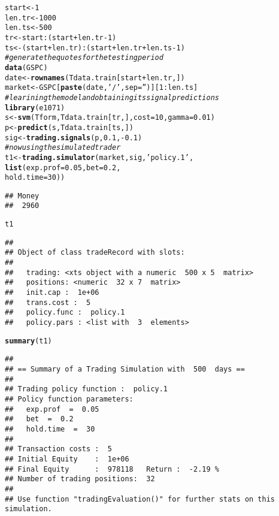 \documentclass{article}\usepackage[]{graphicx}\usepackage[]{color}
\makeatletter
\newcommand{\hlnum}[1]{\textcolor[rgb]{0.686,0.059,0.569}{#1}}%
\newcommand{\hlstr}[1]{\textcolor[rgb]{0.192,0.494,0.8}{#1}}%
\newcommand{\hlcom}[1]{\textcolor[rgb]{0.678,0.584,0.686}{\textit{#1}}}%
\newcommand{\hlopt}[1]{\textcolor[rgb]{0,0,0}{#1}}%
\newcommand{\hlstd}[1]{\textcolor[rgb]{0.345,0.345,0.345}{#1}}%
\newcommand{\hlkwb}[1]{\textcolor[rgb]{0.69,0.353,0.396}{#1}}%
\newcommand{\hlkwc}[1]{\textcolor[rgb]{0.333,0.667,0.333}{#1}}%
\newcommand{\hlkwd}[1]{\textcolor[rgb]{0.737,0.353,0.396}{\textbf{#1}}}%
\newenvironment{kframe}{%
 \def\at@end@of@kframe{}%
 \ifinner\ifhmode%
  \def\at@end@of@kframe{\end{minipage}}%
  \begin{minipage}{\columnwidth}%
 \fi\fi%
 \def\FrameCommand##1{\hskip\@totalleftmargin \hskip-\fboxsep
 \colorbox{shadecolor}{##1}\hskip-\fboxsep
     \hskip-\linewidth \hskip-\@totalleftmargin \hskip\columnwidth}%
 \MakeFramed {\advance\hsize-\width
   \@totalleftmargin\z@ \linewidth\hsize
   \@setminipage}}%
 {\par\unskip\endMakeFramed%
 \at@end@of@kframe}
\newenvironment{knitrout}{}{} %
\makeatother
\begin{document}
\begin{knitrout}
\color{fgcolor}\begin{kframe}
\begin{alltt}
\hlstd{start} \hlkwb{<-} \hlnum{1}
\hlstd{len.tr} \hlkwb{<-} \hlnum{1000}
\hlstd{len.ts} \hlkwb{<-} \hlnum{500}
\hlstd{tr} \hlkwb{<-} \hlstd{start}\hlopt{:}\hlstd{(start}\hlopt{+}\hlstd{len.tr}\hlopt{-}\hlnum{1}\hlstd{)}
\hlstd{ts} \hlkwb{<-} \hlstd{(start} \hlopt{+} \hlstd{len.tr)}\hlopt{:}\hlstd{(start}\hlopt{+}\hlstd{len.tr}\hlopt{+}\hlstd{len.ts}\hlopt{-}\hlnum{1}\hlstd{)}
\hlcom{#generate the quotes for the testing period}
\hlkwd{data}\hlstd{(GSPC)}
\hlstd{date} \hlkwb{<-} \hlkwd{rownames}\hlstd{(Tdata.train[start}\hlopt{+}\hlstd{len.tr, ])}
\hlstd{market} \hlkwb{<-} \hlstd{GSPC[}\hlkwd{paste}\hlstd{(date,} \hlstr{'/'}\hlstd{,} \hlkwc{sep} \hlstd{=} \hlstr{''}\hlstd{)][}\hlnum{1}\hlopt{:}\hlstd{len.ts]}
\hlcom{#learining the model and obtaining its signal predictions}
\hlkwd{library}\hlstd{(e1071)}
\hlstd{s} \hlkwb{<-} \hlkwd{svm}\hlstd{(Tform, Tdata.train[tr, ],} \hlkwc{cost} \hlstd{=} \hlnum{10}\hlstd{,} \hlkwc{gamma} \hlstd{=} \hlnum{0.01}\hlstd{)}
\hlstd{p} \hlkwb{<-} \hlkwd{predict}\hlstd{(s, Tdata.train[ts, ])}
\hlstd{sig} \hlkwb{<-} \hlkwd{trading.signals}\hlstd{(p,} \hlnum{0.1}\hlstd{,} \hlopt{-}\hlnum{0.1}\hlstd{)}
\hlcom{#now using the simulated trader}
\hlstd{t1} \hlkwb{<-} \hlkwd{trading.simulator}\hlstd{(market, sig,} \hlstr{'policy.1'}\hlstd{,}
                      \hlkwd{list}\hlstd{(}\hlkwc{exp.prof} \hlstd{=} \hlnum{0.05}\hlstd{,} \hlkwc{bet} \hlstd{=} \hlnum{0.2}\hlstd{,}
                           \hlkwc{hold.time} \hlstd{=} \hlnum{30}\hlstd{))}
\end{alltt}
\begin{verbatim}
## Money 
##  2960
\end{verbatim}
\begin{alltt}
\hlstd{t1}
\end{alltt}
\begin{verbatim}
## 
## Object of class tradeRecord with slots:
## 
## 	 trading: <xts object with a numeric  500 x 5  matrix>
## 	 positions: <numeric  32 x 7  matrix>
## 	 init.cap :  1e+06 
## 	 trans.cost :  5 
## 	 policy.func :  policy.1 
## 	 policy.pars : <list with  3  elements>
\end{verbatim}
\begin{alltt}
\hlkwd{summary}\hlstd{(t1)}
\end{alltt}
\begin{verbatim}
## 
## == Summary of a Trading Simulation with  500  days ==
## 
## Trading policy function :  policy.1 
## Policy function parameters:
## 	 exp.prof  =  0.05 
## 	 bet  =  0.2 
## 	 hold.time  =  30 
## 
## Transaction costs :  5 
## Initial Equity    :  1e+06 
## Final Equity      :  978118   Return :  -2.19 %
## Number of trading positions:  32 
## 
## Use function "tradingEvaluation()" for further stats on this simulation.
\end{verbatim}
\end{kframe}
\end{knitrout}
\end{document}
